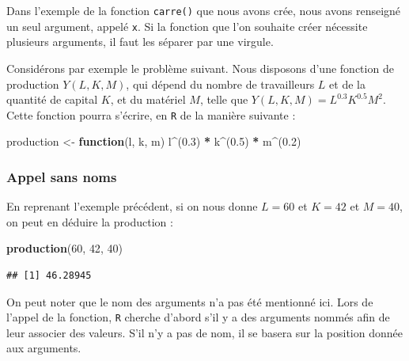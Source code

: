 \documentclass[
  11pt,
]{book}
\newenvironment{Shaded}{\begin{snugshade}}{\end{snugshade}}
\newcommand{\ControlFlowTok}[1]{\textcolor[rgb]{0.13,0.29,0.53}{\textbf{#1}}}
\newcommand{\DecValTok}[1]{\textcolor[rgb]{0.00,0.00,0.81}{#1}}
\newcommand{\FloatTok}[1]{\textcolor[rgb]{0.00,0.00,0.81}{#1}}
\newcommand{\KeywordTok}[1]{\textcolor[rgb]{0.13,0.29,0.53}{\textbf{#1}}}
\newcommand{\NormalTok}[1]{#1}
\newcommand{\OperatorTok}[1]{\textcolor[rgb]{0.81,0.36,0.00}{\textbf{#1}}}
\newcommand{\StringTok}[1]{\textcolor[rgb]{0.31,0.60,0.02}{#1}}
\numberwithin{equation}{section}
\numberwithin{countremarque}{section}
\begin{document}
Dans l'exemple de la fonction \texttt{carre()} que nous avons crée, nous avons renseigné un seul argument, appelé \texttt{x}. Si la fonction que l'on souhaite créer nécessite plusieurs arguments, il faut les séparer par une virgule.

Considérons par exemple le problème suivant. Nous disposons d'une fonction de production \(Y(L,K, M)\), qui dépend du nombre de travailleurs \(L\) et de la quantité de capital \(K\), et du matériel \(M\), telle que \(Y(L,K, M) = L^{0.3}K^{0.5}M^{2}\). Cette fonction pourra s'écrire, en \texttt{R} de la manière suivante :

\begin{Shaded}
\begin{Highlighting}[]
\NormalTok{production \textless{}{-}}\StringTok{ }\ControlFlowTok{function}\NormalTok{(l, k, m) l}\OperatorTok{\^{}}\NormalTok{(}\FloatTok{0.3}\NormalTok{) }\OperatorTok{*}\StringTok{ }\NormalTok{k}\OperatorTok{\^{}}\NormalTok{(}\FloatTok{0.5}\NormalTok{) }\OperatorTok{*}\StringTok{ }\NormalTok{m}\OperatorTok{\^{}}\NormalTok{(}\FloatTok{0.2}\NormalTok{)}
\end{Highlighting}
\end{Shaded}

\hypertarget{fonctions_structure_parametres_appel_noms}{%
\subsubsection{Appel sans noms}\label{fonctions_structure_parametres_appel_noms}}

En reprenant l'exemple précédent, si on nous donne \(L = 60\) et \(K = 42\) et \(M = 40\), on peut en déduire la production :

\begin{Shaded}
\begin{Highlighting}[]
\KeywordTok{production}\NormalTok{(}\DecValTok{60}\NormalTok{, }\DecValTok{42}\NormalTok{, }\DecValTok{40}\NormalTok{)}
\end{Highlighting}
\end{Shaded}

\begin{lstlisting}
## [1] 46.28945
\end{lstlisting}

On peut noter que le nom des arguments n'a pas été mentionné ici. Lors de l'appel de la fonction, \texttt{R} cherche d'abord s'il y a des arguments nommés afin de leur associer des valeurs. S'il n'y a pas de nom, il se basera sur la position donnée aux arguments.
\end{document}
